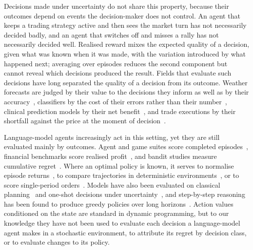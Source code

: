 \documentclass[10pt,a4paper,twocolumn]{article}
\begin{document}
Decisions made under uncertainty do not share this property, because their outcomes depend on events the decision-maker does not control. An agent that keeps a trading strategy active and then sees the market turn has not necessarily decided badly, and an agent that switches off and misses a rally has not necessarily decided well. Realised reward mixes the expected quality of a decision, given what was known when it was made, with the variation introduced by what happened next; averaging over episodes reduces the second component but cannot reveal which decisions produced the result. Fields that evaluate such decisions have long separated the quality of a decision from its outcome. Weather forecasts are judged by their value to the decisions they inform as well as by their accuracy~\cite{murphy1993,richardson2000}, classifiers by the cost of their errors rather than their number~\cite{elkan2001}, clinical prediction models by their net benefit~\cite{vickers2006}, and trade executions by their shortfall against the price at the moment of decision~\cite{perold1988}.

Language-model agents increasingly act in this setting, yet they are still evaluated mainly by outcomes. Agent and game suites score completed episodes~\cite{agentbench,mint,smartplay,balrog}, financial benchmarks score realised profit~\cite{kellybench,livetradebench,stockbench}, and bandit studies measure cumulative regret~\cite{krishnamurthy2024,nie2024evolve,park2024regret}. Where an optimal policy is known, it serves to normalise episode returns~\cite{agentick,llmsdm2026}, to compare trajectories in deterministic environments~\cite{costbench}, or to score single-period orders~\cite{aimbench,llmnewsvendor}. Models have also been evaluated on classical planning~\cite{planbench} and one-shot decisions under uncertainty~\cite{dellma}, and step-by-step reasoning has been found to produce greedy policies over long horizons~\cite{whyreasoningfails}. Action values conditioned on the state are standard in dynamic programming, but to our knowledge they have not been used to evaluate each decision a language-model agent makes in a stochastic environment, to attribute its regret by decision class, or to evaluate changes to its policy.
\end{document}
